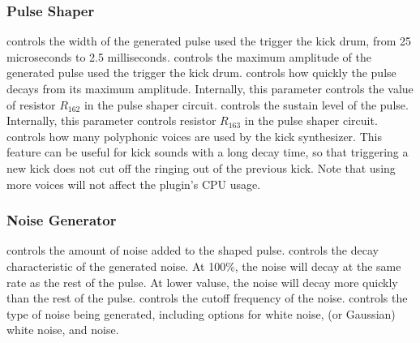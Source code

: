 \documentclass[landscape,twocolumn,a5paper]{manual}
\begin{document}
\subsubsection{Pulse Shaper}
 controls the width of the generated pulse
used the trigger the kick drum, from 25 microseconds
to 2.5 milliseconds.
\newpar
{} controls the maximum amplitude of the
generated pulse used the trigger the kick drum.
\newpar
{} controls how quickly the pulse decays from
its maximum amplitude. Internally, this parameter controls
the value of resistor $R_{162}$ in the pulse shaper circuit.
\newpar
{} controls the sustain level of the pulse.
Internally, this parameter controls resistor $R_{163}$ in
the pulse shaper circuit.
\newpar
{} controls how many polyphonic voices are
used by the kick synthesizer. This feature can be useful for
kick sounds with a long decay time, so that triggering a new
kick does not cut off the ringing out of the previous kick.
Note that using more voices will not affect the plugin's
CPU usage.

\subsubsection{Noise Generator}
 controls the amount of noise added to
the shaped pulse.
\newpar
{} controls the decay characteristic of the
generated noise. At 100\%, the noise will decay at the same rate
as the rest of the pulse. At lower valuse, the noise will decay
more quickly than the rest of the pulse.
\newpar
{} controls the cutoff frequency of the noise.
\newpar
{} controls the type of noise being generated,
including options for  white noise, 
(or Gaussian) white noise, and  noise.
\end{document}
